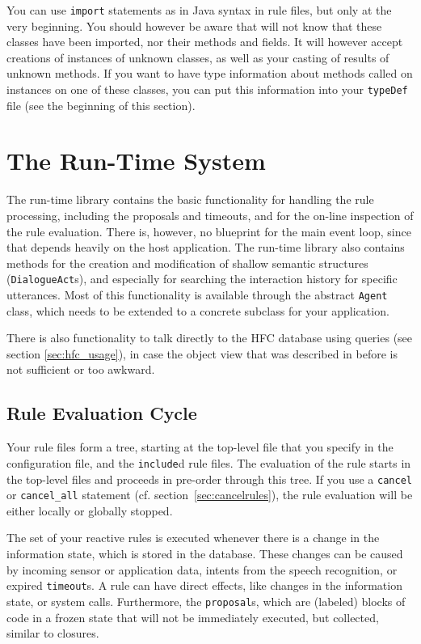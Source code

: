 You can use \texttt{import} statements as in Java syntax in rule
files, but only at the very beginning. You should however be aware
that \vonda will not know that these classes have been imported, nor
their methods and fields. It will however accept creations of
instances of unknown classes, as well as your casting of results of
unknown methods. If you want \vonda to have type information about
methods called on instances on one of these classes, you can put this
information into your \texttt{typeDef} file (see the beginning of this
section).

\section{The Run-Time System}

The run-time library contains the basic functionality for handling the rule
processing, including the proposals and timeouts, and for the on-line
inspection of the rule evaluation. There is, however, no blueprint for the main
event loop, since that depends heavily on the host application. The run-time
library also contains methods for the creation and modification of shallow
semantic structures (\texttt{DialogueAct}s), and especially for searching the
interaction history for specific utterances. Most of this functionality is
available through the abstract \texttt{Agent} class, which needs to be extended
to a concrete subclass for your application.

There is also functionality to talk directly to the HFC database using queries
(see section \ref{sec:hfc_usage}), in case the object view that was
described in before is not sufficient or too awkward.

\subsection{Rule Evaluation Cycle}
\label{sec:ruleevaluation}

Your \vonda rule files form a tree, starting at the top-level file that you
specify in the configuration file, and the \texttt{include}d rule files. The
evaluation of the rule starts in the top-level files and proceeds in pre-order
through this tree. If you use a \texttt{cancel} or \texttt{cancel\_all}
statement (cf. section~\ref{sec:cancelrules}), the rule evaluation will be
either locally or globally stopped.

The set of your reactive \vonda rules is executed whenever there is a change in
the information state, which is stored in the database. These changes can be
caused by incoming sensor or application data, intents from the speech
recognition, or expired \texttt{timeout}s.  A rule can have direct effects,
like changes in the information state, or system calls. Furthermore, the
\texttt{proposal}s, which are (labeled) blocks of code in a frozen state that
will not be immediately executed, but collected, similar to closures.

